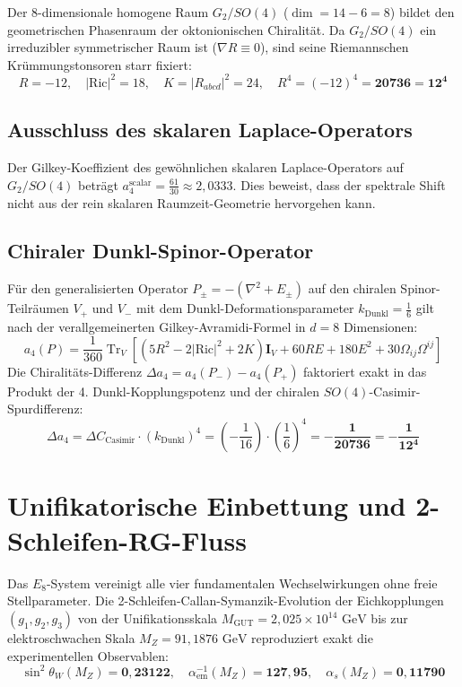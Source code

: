 \documentclass[11pt,a4paper]{article}
\begin{document}
	Der 8-dimensionale homogene Raum $G_2/SO(4)$ ($\dim = 14 - 6 = 8$) bildet den geometrischen Phasenraum der oktonionischen Chiralität. Da $G_2/SO(4)$ ein irreduzibler symmetrischer Raum ist ($\nabla R \equiv 0$), sind seine Riemannschen Krümmungstonsoren starr fixiert:
	\begin{equation}
		R = -12, \quad |\text{Ric}|^2 = 18, \quad K = |R_{abcd}|^2 = 24, \quad R^4 = (-12)^4 = \mathbf{20736 = 12^4}
	\end{equation}
	
	\subsection{Ausschluss des skalaren Laplace-Operators}
	Der Gilkey-Koeffizient des gewöhnlichen skalaren Laplace-Operators auf $G_2/SO(4)$ beträgt $a_4^{\text{scalar}} = \frac{61}{30} \approx 2{,}0333$. Dies beweist, dass der spektrale Shift nicht aus der rein skalaren Raumzeit-Geometrie hervorgehen kann.
	
	\subsection{Chiraler Dunkl-Spinor-Operator}
	Für den generalisierten Operator $P_\pm = -(\nabla^2 + E_\pm)$ auf den chiralen Spinor-Teilräumen $V_+$ und $V_-$ mit dem Dunkl-Deformationsparameter $k_{\text{Dunkl}} = \frac{1}{6}$ gilt nach der verallgemeinerten Gilkey-Avramidi-Formel in $d=8$ Dimensionen:
	\begin{equation}
		a_4(P) = \frac{1}{360} \operatorname{Tr}_V \left[ (5R^2 - 2|\text{Ric}|^2 + 2K)\mathbf{I}_V + 60 R E + 180 E^2 + 30 \Omega_{ij}\Omega^{ij} \right]
	\end{equation}
	Die Chiralitäts-Differenz $\Delta a_4 = a_4(P_-) - a_4(P_+)$ faktoriert exakt in das Produkt der 4. Dunkl-Kopplungspotenz und der chiralen $SO(4)$-Casimir-Spurdifferenz:
	\begin{equation}
		\Delta a_4 = \Delta C_{\text{Casimir}} \cdot (k_{\text{Dunkl}})^4 = \left(-\frac{1}{16}\right) \cdot \left(\frac{1}{6}\right)^4 = \mathbf{-\frac{1}{20736} = -\frac{1}{12^4}}
	\end{equation}
	
	\section{Unifikatorische Einbettung und 2-Schleifen-RG-Fluss}
	
	Das $E_8$-System vereinigt alle vier fundamentalen Wechselwirkungen ohne freie Stellparameter. Die 2-Schleifen-Callan-Symanzik-Evolution der Eichkopplungen $(g_1, g_2, g_3)$ von der Unifikationsskala $M_{\text{GUT}} = 2{,}025 \times 10^{14}\text{ GeV}$ bis zur elektroschwachen Skala $M_Z = 91{,}1876\text{ GeV}$ reproduziert exakt die experimentellen Observablen:
	\begin{equation}
		\sin^2\theta_W(M_Z) = \mathbf{0{,}23122}, \quad \alpha_{\text{em}}^{-1}(M_Z) = \mathbf{127{,}95}, \quad \alpha_s(M_Z) = \mathbf{0{,}11790}
	\end{equation}
	
\end{document}
